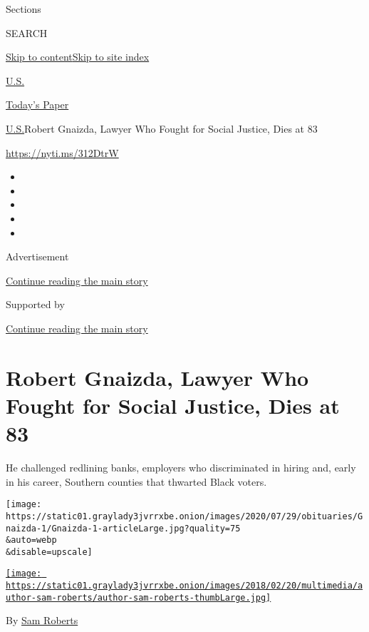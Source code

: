 Sections

SEARCH

\protect\hyperlink{site-content}{Skip to
content}\protect\hyperlink{site-index}{Skip to site index}

\href{https://www.nytimes3xbfgragh.onion/section/us}{U.S.}

\href{https://myaccount.nytimes3xbfgragh.onion/auth/login?response_type=cookie\&client_id=vi}{}

\href{https://www.nytimes3xbfgragh.onion/section/todayspaper}{Today's
Paper}

\href{/section/us}{U.S.}\textbar{}Robert Gnaizda, Lawyer Who Fought for
Social Justice, Dies at 83

\url{https://nyti.ms/312DtrW}

\begin{itemize}
\item
\item
\item
\item
\item
\end{itemize}

Advertisement

\protect\hyperlink{after-top}{Continue reading the main story}

Supported by

\protect\hyperlink{after-sponsor}{Continue reading the main story}

\hypertarget{robert-gnaizda-lawyer-who-fought-for-social-justice-dies-at-83}{%
\section{Robert Gnaizda, Lawyer Who Fought for Social Justice, Dies at
83}\label{robert-gnaizda-lawyer-who-fought-for-social-justice-dies-at-83}}

He challenged redlining banks, employers who discriminated in hiring
and, early in his career, Southern counties that thwarted Black voters.

\texttt{[image: https://static01.graylady3jvrrxbe.onion/images/2020/07/29/obituaries/Gnaizda-1/Gnaizda-1-articleLarge.jpg?quality=75\\\&auto=webp\\\&disable=upscale]}

\href{https://www.nytimes3xbfgragh.onion/by/sam-roberts}{\texttt{[image: https://static01.graylady3jvrrxbe.onion/images/2018/02/20/multimedia/author-sam-roberts/author-sam-roberts-thumbLarge.jpg]}}

By \href{https://www.nytimes3xbfgragh.onion/by/sam-roberts}{Sam Roberts}

